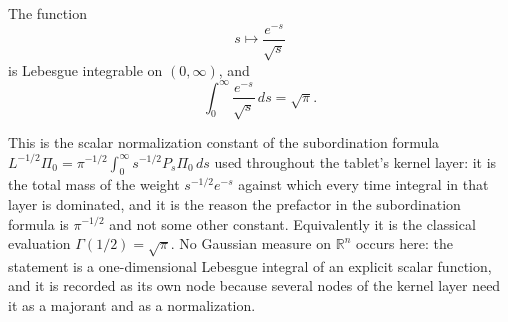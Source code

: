 \begin{lemma}
The function
\[
  s \longmapsto \frac{e^{-s}}{\sqrt s}
\]
is Lebesgue integrable on $(0,\infty)$, and
\[
  \int_0^\infty \frac{e^{-s}}{\sqrt s}\,ds = \sqrt\pi .
\]

This is the scalar normalization constant of the subordination formula
$L^{-1/2}\Pi_0 = \pi^{-1/2}\int_0^\infty s^{-1/2}P_s\Pi_0\,ds$ used throughout
the tablet's kernel layer: it is the total mass of the weight $s^{-1/2}e^{-s}$
against which every time integral in that layer is dominated, and it is the
reason the prefactor in the subordination formula is $\pi^{-1/2}$ and not some
other constant.  Equivalently it is the classical evaluation
$\Gamma(1/2) = \sqrt\pi$.  No Gaussian measure on $\mathbb{R}^n$ occurs here:
the statement is a one-dimensional Lebesgue integral of an explicit scalar
function, and it is recorded as its own node because several nodes of the kernel
layer need it as a majorant and as a normalization.
\end{lemma}
